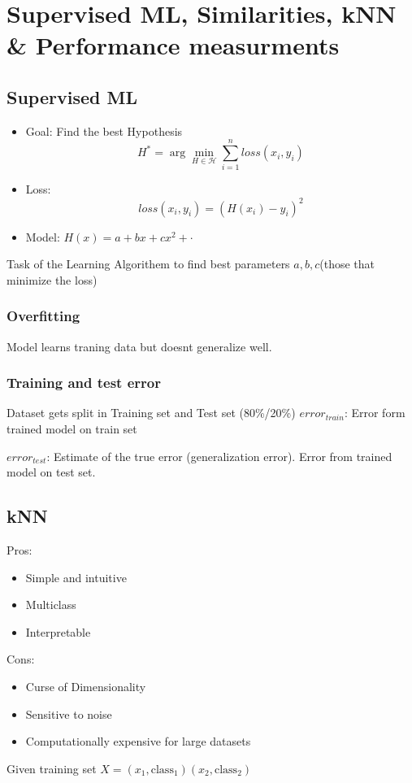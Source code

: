\section{Supervised ML, Similarities, kNN \& Performance measurments}

\subsection{Supervised ML}
\begin{itemize}
    \item Goal: Find the best Hypothesis
    \[
    H^* = \arg \min_{H\in\mathcal{H}}\sum_{i=1}^{n}loss(x_i,y_i)
    \]
    \item Loss: 
    \[
        loss(x_i,y_i) = (H(x_i) - y_i)^2
    \]
    \item Model: \(H(x) = a + bx + cx^2 + \cdot\)
\end{itemize}
Task of the Learning Algorithem to find best parameters \(a,b,c\)(those that minimize the loss)
\subsubsection{Overfitting}
Model learns traning data but doesnt generalize well.

\subsubsection{Training and test error}
Dataset gets split in Training set and Test set (80\%/20\%)
\(error_{train}\): Error form trained model on train set

\(error_{test}\): Estimate of the true error (generalization error). Error from trained model on test set.
\subsection{kNN}
Pros:
\begin{itemize}
    \item Simple and intuitive
    \item Multiclass
    \item Interpretable 
\end{itemize}
Cons:
\begin{itemize}
    \item Curse of Dimensionality
    \item Sensitive to noise
    \item Computationally expensive for large datasets
\end{itemize}
Given training set \(X = (x_1,\text{class}_1)(x_2,\text{class}_2)\)

